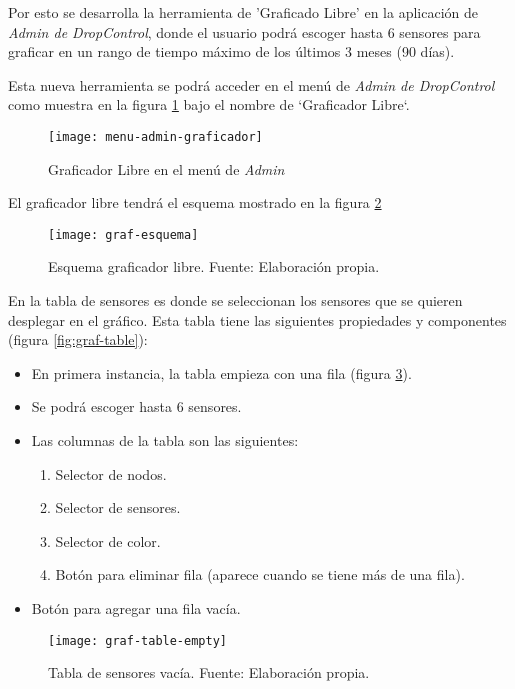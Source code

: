 Por esto se desarrolla la herramienta de 'Graficado Libre' en la aplicación de \textit{Admin de DropControl},
donde el usuario podrá escoger hasta 6 sensores para graficar en un rango de tiempo máximo de los últimos 3 meses (90 días).

Esta nueva herramienta se podrá acceder en el menú de \textit{Admin de DropControl} como muestra en la figura \ref{fig:menu-admin-graf1} bajo el nombre de `Graficador Libre`. 

\begin{figure}[H]
	\centering
	\texttt{[image: menu-admin-graficador]}
	\caption{\label{fig:menu-admin-graf1} Graficador Libre en el menú de \textit{Admin}}
\end{figure}

El graficador libre tendrá el esquema mostrado en la figura \ref*{fig:graf-esquema}

\begin{figure}[H]
	\centering
	\texttt{[image: graf-esquema]}
	\caption{\label{fig:graf-esquema} Esquema graficador libre. Fuente: Elaboración propia.}
\end{figure}

En la tabla de sensores es donde se seleccionan los sensores que se quieren desplegar en el gráfico. Esta tabla tiene las siguientes propiedades y componentes (figura \ref{fig:graf-table}):
\begin{itemize}
    \item En primera instancia, la tabla empieza con una fila (figura \ref{fig:graf-table-empty}).
    \item Se podrá escoger hasta 6 sensores.
    \item Las columnas de la tabla son las siguientes:
          \begin{enumerate}
              \item Selector de nodos.
              \item Selector de sensores.
              \item Selector de color.
              \item Botón para eliminar fila (aparece cuando se tiene más de una fila).
          \end{enumerate}
    \item Botón para agregar una fila vacía.
\end{itemize}

\begin{figure}[H]
	\centering
	\texttt{[image: graf-table-empty]}
	\caption{\label{fig:graf-table-empty} Tabla de sensores vacía. Fuente: Elaboración propia.}
\end{figure}

